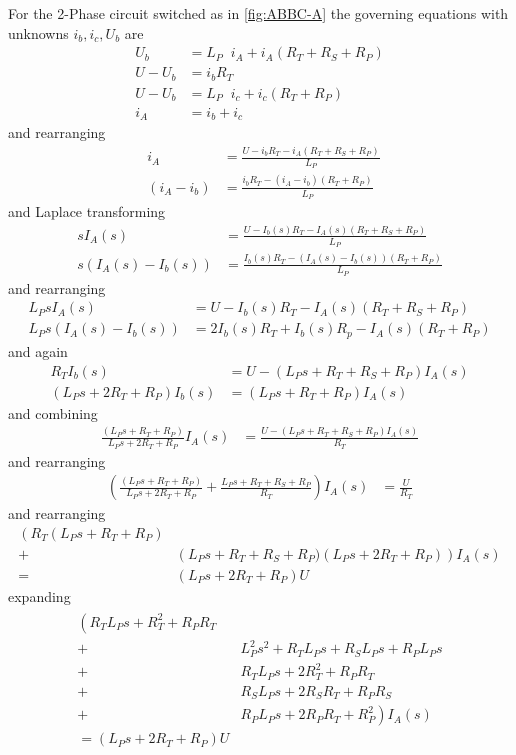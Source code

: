 \documentclass[12pt,a4paper,oneside,openany]{article}
\DeclareMathOperator{\udt}{\frac{d}{dt}}
\begin{document}
For the 2-Phase circuit switched as in \cref{fig:ABBC-A} the governing equations with unknowns $i_b,i_c,U_b$ are
\begin{align}
U_b &= L_P \udt i_A + i_A (R_T + R_S + R_P) \\
U-U_b &= i_b R_T \\
U-U_b &= L_P \udt i_c + i_c (R_T + R_P) \\
i_A &= i_b + i_c
\end{align}
and rearranging 
\begin{align}
\udt i_A  &= \frac{U - i_b R_T - i_A (R_T + R_S + R_P)}{L_P} \\
\udt (i_A - i_b)  &= \frac{i_b R_T - (i_A - i_b) (R_T + R_P)}{L_P}
\end{align}
and Laplace transforming
\begin{align}
s I_A(s)  &= \frac{U - I_b(s) R_T - I_A(s) (R_T + R_S + R_P)}{L_P} \\
s \left( I_A(s) - I_b(s) \right) &= \frac{I_b(s) R_T - \left(I_A(s) - I_b(s)\right) (R_T + R_P)}{L_P}
\end{align}
and rearranging
\begin{align}
L_P s I_A(s)  &= U - I_b(s) R_T - I_A(s) (R_T + R_S + R_P) \\
L_P s \left( I_A(s) - I_b(s) \right) &= 2 I_b(s) R_T + I_b(s) R_p - I_A(s) (R_T + R_P)
\end{align}
and again
\begin{align}
R_T I_b(s) &= U - (L_P s + R_T + R_S + R_P) I_A(s)  \\
\left(L_P s + 2 R_T + R_P\right) I_b(s) &= (L_P s + R_T + R_P) I_A(s) 
\end{align}
and combining
\begin{align}
\frac{(L_P s + R_T + R_P)}{L_P s + 2 R_T + R_P} I_A(s)&= \frac{U - (L_P s + R_T + R_S + R_P) I_A(s)}{R_T}
\end{align}
and rearranging
\begin{align}
\left( \frac{(L_P s + R_T + R_P)}{L_P s + 2 R_T + R_P} + \frac{L_P s + R_T + R_S + R_P}{R_T} \right) I_A(s) &= \frac{U}{R_T}
\end{align}
and rearranging
\begin{align}
\left( R_T (L_P s + R_T + R_P) \right. \\
+ &\left (L_P s + R_T + R_S + R_P) (L_P s + 2 R_T + R_P) \right) I_A(s) \\
 = &(L_P s + 2 R_T + R_P) U
\end{align}
expanding
\begin{gather}
\begin{aligned}
\left( R_T L_P s + R_T^2 + R_P R_T \right. \\
+ & L_P^2 s^2 + R_T L_P s + R_S L_P s + R_P L_P s \\
+ & R_T L_P s + 2R_T^2 + R_P R_T \\
+ & R_S L_P s + 2 R_S R_T + R_P R_S\\
+ &\left. R_P L_P s + 2 R_P R_T + R_P^2 \right) I_A(s) \\
 = (L_P s + 2 R_T + R_P) U
\end{aligned}
\end{gather}
\end{document}

